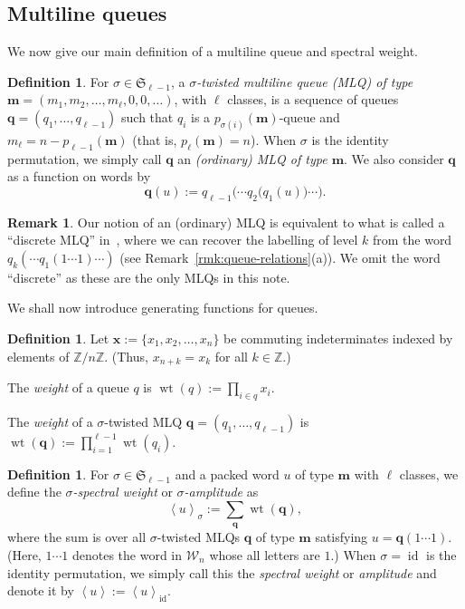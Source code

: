 \documentclass[reqno]{amsart}
\newcommand{\0}{\phantom{c}}
\newcommand{\swt}[1]{\left\langle #1 \right\rangle} %
\newcommand{\SymGp}[1]{\mathfrak{S}_{#1}} %
\DeclareMathOperator{\wt}{wt} %
\DeclareMathOperator{\id}{id} %
\newcommand{\xx}{\mathbf{x}}
\newcommand{\mm}{\mathbf{m}}
\newcommand{\qq}{\mathbf{q}}
\newcommand{\mcW}{\mathcal{W}}
\newcommand{\ZZ}{\mathbb{Z}}
\let\sumnonlimits\sum
\let\prodnonlimits\prod
\renewcommand{\sum}{\sumnonlimits\limits}
\renewcommand{\prod}{\prodnonlimits\limits}
\newcommand{\tup}[1]{\left( #1 \right)}
\newcommand{\defn}[1]{{\color{darkred}\emph{#1}}} %
\theoremstyle{plain}
\theoremstyle{definition}
\newtheorem{dfn}[thm]{Definition}
\newtheorem{remark}[thm]{Remark}
\numberwithin{equation}{section}
\begin{document}
\subsection{Multiline queues}

We now give our main definition of a multiline queue and spectral weight.

\begin{dfn}
For $\sigma \in \SymGp{\ell-1}$, a \defn{$\sigma$-twisted multiline queue (MLQ) of type $\mm = \tup{m_1, m_2, \ldots, m_\ell, 0, 0, \ldots}$}, with $\ell$ classes, is a sequence of queues $\qq = (q_1, \dotsc, q_{\ell-1})$ such that $q_i$ is a $p_{\sigma(i)}(\mm)$-queue and $m_{\ell} = n - p_{\ell-1}(\mm)$ (that is, $p_\ell(\mm) = n$).
When $\sigma$ is the identity permutation, we simply call $\qq$ an \defn{(ordinary) MLQ of type $\mm$}.
We also consider $\qq$ as a function on words by
\[
\qq(u) := q_{\ell-1}\bigl( \cdots q_2\bigl( q_1(u) \bigr) \cdots \bigr).
\]
\end{dfn}

\begin{remark}
Our notion of an (ordinary) MLQ is equivalent to what is called a ``discrete MLQ'' in~\cite[\S 2.2]{AasLin17}, where we can recover the labelling of level $k$ from the word $q_k( \cdots q_1(1 \dotsm 1) \cdots )$ (see Remark~\ref{rmk:queue-relations}(a)).
We omit the word ``discrete'' as these are the only MLQs in this note.
\end{remark}

We shall now introduce generating functions for queues.

\begin{dfn}
Let $\xx := \{x_1, x_2, \ldots, x_n\}$ be commuting indeterminates indexed by elements of $\ZZ / n \ZZ$. (Thus, $x_{n+k} = x_k$ for all $k \in \ZZ$.)

The \defn{weight} of a queue $q$ is $\wt(q) := \prod_{i \in q} x_i$.

The \defn{weight} of a $\sigma$-twisted MLQ $\qq = (q_1, \dotsc, q_{\ell-1})$ is $\wt(\qq) := \prod_{i=1}^{\ell-1} \wt(q_i)$.
\end{dfn}

\begin{dfn}
For $\sigma \in \SymGp{\ell-1}$ and a packed word $u$ of type $\mm$ with $\ell$ classes, we define the \defn{$\sigma$-spectral weight} or \defn{$\sigma$-amplitude} as
\begin{equation}
\label{eq:amplitude}
  \swt{u}_{\sigma} := \sum_{\qq} \wt(\qq),
\end{equation}
where the sum is over all $\sigma$-twisted MLQs $\qq$ of type $\mm$ satisfying $u = \qq(1 \dotsm 1)$.
(Here, $1 \dotsm 1$ denotes the word in $\mcW_n$ whose all letters are $1$.)
When $\sigma = \id$ is the identity permutation, we simply call this the \defn{spectral weight} or \defn{amplitude} and denote it by $\swt{u} := \swt{u}_{\id}$.
\end{dfn}
\end{document}
